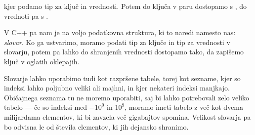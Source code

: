 
\vspace{-0.5cm}
\noindent
kjer podamo tip za ključ in vrednosti.
Potem do ključa v paru dostopamo s , do vrednoti pa s
.

V C++ pa nam je na voljo podatkovna struktura, ki to naredi namesto nas:
\emph{slovar}.
Ko ga ustvarimo, moramo podati tip za ključe in tip za vrednosti v slovarju,
potem pa lahko do shranjenih vrednosti dostopamo tako, da zapišemo ključ v
oglatih oklepajih.


Slovarje lahko uporabimo tudi kot razpršene tabele, torej kot sezname, kjer so
indeksi lahko poljubno veliki ali majhni, in kjer nekateri indeksi manjkajo. 
Običajnega seznama tu ne moremo uporabiti, saj bi lahko potrebovali zelo veliko
tabelo --- če so indeksi med $-10^9$ in $10^9$, moramo imeti tabelo z več kot
dvema milijardama elementov, ki bi zavzela več gigabajtov spomina.
Velikost slovarja pa bo odvisna le od števila elementov, ki jih dejansko
shranimo.





